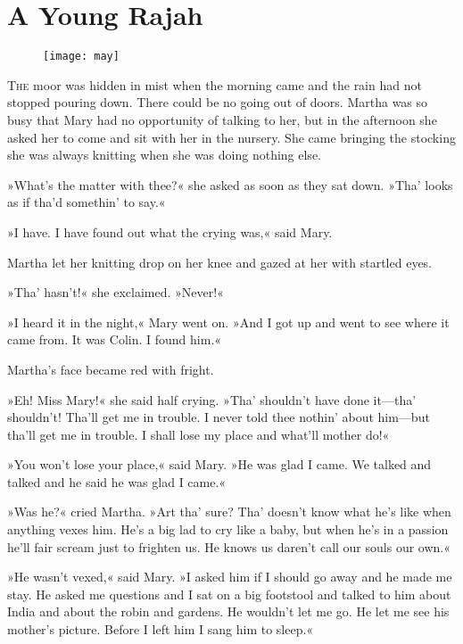 \chapter{A Young Rajah} 
	
\begin{figure}[t!]
\centering
\texttt{[image: may]}
\end{figure}

	\lettrine[lines=6]{T}{he} moor was hidden in mist when the morning came and the rain had not stopped pouring down. There could be no going out of doors. Martha was so busy that Mary had no opportunity of talking to her, but in the afternoon she asked her to come and sit with her in the nursery. She came bringing the stocking she was always knitting when she was doing nothing else.

\zz
»What's the matter with thee?« she asked as soon as they sat down. »Tha' looks as if tha'd somethin' to say.«

»I have. I have found out what the crying was,« said Mary.

Martha let her knitting drop on her knee and gazed at her with startled eyes.

»Tha' hasn't!« she exclaimed. »Never!«

»I heard it in the night,« Mary went on. »And I got up and went to see where it came from. It was Colin. I found him.«

Martha's face became red with fright.

»Eh! Miss Mary!« she said half crying. »Tha' shouldn't have done it—tha' shouldn't! Tha'll get me in trouble. I never told thee nothin' about him—but tha'll get me in trouble. I shall lose my place and what'll mother do!«

»You won't lose your place,« said Mary. »He was glad I came. We talked and talked and he said he was glad I came.«

»Was he?« cried Martha. »Art tha' sure? Tha' doesn't know what he's like when anything vexes him. He's a big lad to cry like a baby, but when he's in a passion he'll fair scream just to frighten us. He knows us daren't call our souls our own.«

»He wasn't vexed,« said Mary. »I asked him if I should go away and he made me stay. He asked me questions and I sat on a big footstool and talked to him about India and about the robin and gardens. He wouldn't let me go. He let me see his mother's picture. Before I left him I sang him to sleep.«

